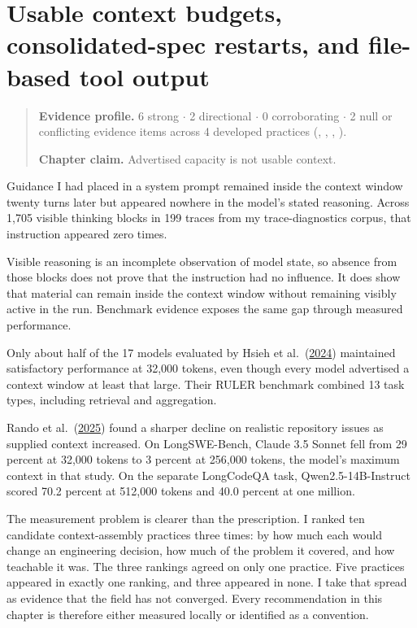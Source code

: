 \chapter{Usable context budgets, consolidated-spec restarts, and file-based tool output}
\label{ch14-usable-context-budgets-spec-restarts-file-output}
\begin{quote}
\textbf{Evidence profile.} 6 strong \(\cdot\) 2 directional \(\cdot\) 0 corroborating \(\cdot\) 2 null or conflicting evidence items across 4 developed practices (, , , ).

\textbf{Chapter claim.} Advertised capacity is not usable context.
\end{quote}

Guidance I had placed in a system prompt remained inside the context window twenty turns later but appeared nowhere in the model's stated reasoning. Across 1,705 visible thinking blocks in 199 traces from my trace-diagnostics corpus, that instruction appeared zero times.

Visible reasoning is an incomplete observation of model state, so absence from those blocks does not prove that the instruction had no influence. It does show that material can remain inside the context window without remaining visibly active in the run. Benchmark evidence exposes the same gap through measured performance.

Only about half of the 17 models evaluated by Hsieh et al.~(\href{https://arxiv.org/abs/2404.06654}{2024}) maintained satisfactory performance at 32,000 tokens, even though every model advertised a context window at least that large. Their RULER benchmark combined 13 task types, including retrieval and aggregation.

Rando et al.~(\href{https://arxiv.org/abs/2505.07897}{2025}) found a sharper decline on realistic repository issues as supplied context increased. On LongSWE-Bench, Claude 3.5 Sonnet fell from 29 percent at 32,000 tokens to 3 percent at 256,000 tokens, the model's maximum context in that study. On the separate LongCodeQA task, Qwen2.5-14B-Instruct scored 70.2 percent at 512,000 tokens and 40.0 percent at one million.

The measurement problem is clearer than the prescription. I ranked ten candidate context-assembly practices three times: by how much each would change an engineering decision, how much of the problem it covered, and how teachable it was. The three rankings agreed on only one practice. Five practices appeared in exactly one ranking, and three appeared in none. I take that spread as evidence that the field has not converged. Every recommendation in this chapter is therefore either measured locally or identified as a convention.

